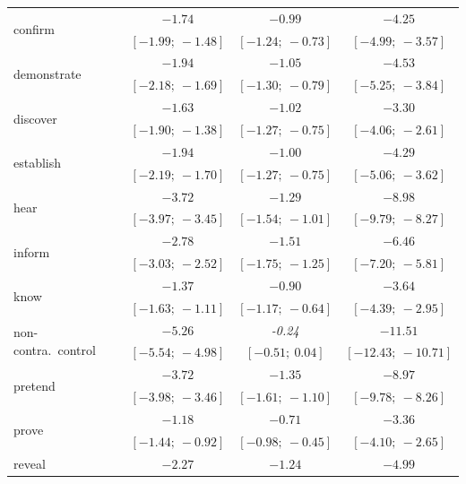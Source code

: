 \documentclass[11pt,fleqn]{article}
\newcommand{\6}{\mbox{$[\hspace*{-.6mm}[$}}
\newcommand{\9}{\mbox{$]\hspace*{-.6mm}]$}}
\begin{document}
\begin{table}
\begin{center}
\begin{tabular}{l c c c}
\multirow{2}{*}{confirm}           & $-1.74$       & $-0.99$       & $-4.25$         \\
                         & $[-1.99;\ -1.48]$ & $[-1.24;\ -0.73]$ & $[-4.99;\ -3.57]$   \\
\multirow{2}{*}{demonstrate}       & $-1.94$       & $-1.05$       & $-4.53$         \\
                         & $[-2.18;\ -1.69]$ & $[-1.30;\ -0.79]$ & $[-5.25;\ -3.84]$   \\
\multirow{2}{*}{discover}          & $-1.63$       & $-1.02$       & $-3.30$         \\
                         & $[-1.90;\ -1.38]$ & $[-1.27;\ -0.75]$ & $[-4.06;\ -2.61]$   \\
\multirow{2}{*}{establish}         & $-1.94$       & $-1.00$       & $-4.29$         \\
                         & $[-2.19;\ -1.70]$ & $[-1.27;\ -0.75]$ & $[-5.06;\ -3.62]$   \\
\multirow{2}{*}{hear}              & $-3.72$       & $-1.29$       & $-8.98$         \\
                         & $[-3.97;\ -3.45]$ & $[-1.54;\ -1.01]$ & $[-9.79;\ -8.27]$   \\
\multirow{2}{*}{inform}            & $-2.78$       & $-1.51$       & $-6.46$         \\
                         & $[-3.03;\ -2.52]$ & $[-1.75;\ -1.25]$ & $[-7.20;\ -5.81]$   \\
\multirow{2}{*}{know}              & $-1.37$       & $-0.90$       & $-3.64$         \\
                         & $[-1.63;\ -1.11]$ & $[-1.17;\ -0.64]$ & $[-4.39;\ -2.95]$   \\
\multirow{2}{*}{non-contra.~control}      & $-5.26$       & \emph{-0.24}           & $-11.51$        \\
                         & $[-5.54;\ -4.98]$ & $[-0.51;\ 0.04]$  & $[-12.43;\ -10.71]$ \\
\multirow{2}{*}{pretend}           & $-3.72$       & $-1.35$       & $-8.97$         \\
                         & $[-3.98;\ -3.46]$ & $[-1.61;\ -1.10]$ & $[-9.78;\ -8.26]$   \\
\multirow{2}{*}{prove}             & $-1.18$       & $-0.71$       & $-3.36$         \\
                         & $[-1.44;\ -0.92]$ & $[-0.98;\ -0.45]$ & $[-4.10;\ -2.65]$   \\
\multirow{2}{*}{reveal}            & $-2.27$       & $-1.24$       & $-4.99$         \\

\end{tabular}
\end{center}
\end{table}
\end{document}
